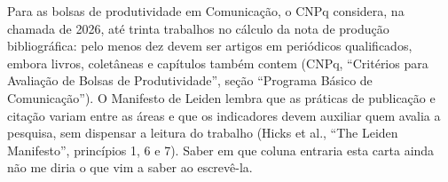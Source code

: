 Para as bolsas de produtividade em Comunicação, o CNPq considera, na chamada de 2026, até trinta trabalhos no cálculo da nota de produção bibliográfica: pelo menos dez devem ser artigos em periódicos qualificados, embora livros, coletâneas e capítulos também contem (CNPq, “Critérios para Avaliação de Bolsas de Produtividade”, seção “Programa Básico de Comunicação”).
O Manifesto de Leiden lembra que as práticas de publicação e citação variam entre as áreas e que os indicadores devem auxiliar quem avalia a pesquisa, sem dispensar a leitura do trabalho (Hicks et al., “The Leiden Manifesto”, princípios 1, 6 e 7).
Saber em que coluna entraria esta carta ainda não me diria o que vim a saber ao escrevê-la.
